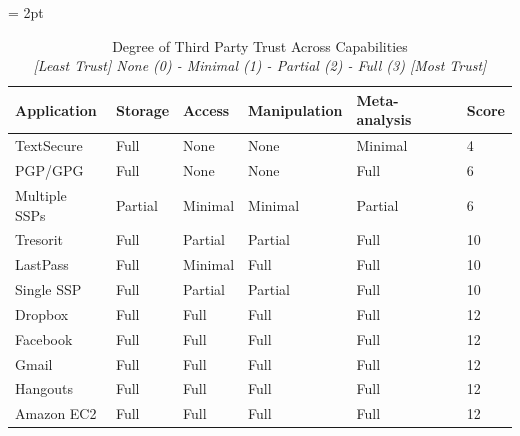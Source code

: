 \begin{table}[!hb]
  \footnotesize
  \centering
  \tabulinesep = 2pt
  \begin{tabu} to \textwidth
    { | X[1,c,m]
      | X[1,c,m]
      | X[1,c,m]
      | X[1,c,m]
      | X[1,c,m]
      | X[0.5,c,m]
      | }
    \hline
    \textbf{Application}
    & \textbf{Storage}
    & \textbf{Access}
    & \textbf{Manipulation}
    & \textbf{Meta-analysis}
    & \textbf{Score}
    \\ \hline
    \rowfont{\color{orange}}
    TextSecure
    & Full
    & None
    & None
    & Minimal
    & 4
    \\ \hline
    \rowfont{\color{orange}}
    PGP/GPG
    & Full
    & None
    & None
    & Full
    & 6
    \\ \hline 
    \rowfont{\color{ForestGreen}}
    Multiple SSPs
    & Partial
    & Minimal
    & Minimal
    & Partial
    & 6
    \\ \hline
    \rowfont{\color{orange}}
    Tresorit
    & Full
    & Partial
    & Partial
    & Full
    & 10
    \\ \hline 
    \rowfont{\color{orange}}
    LastPass
    & Full
    & Minimal
    & Full
    & Full
    & 10
    \\ \hline 
    \rowfont{\color{ForestGreen}}
    Single SSP
    & Full
    & Partial
    & Partial
    & Full
    & 10
    \\ \hline
    \rowfont{\color{blue}}
    Dropbox
    & Full
    & Full
    & Full
    & Full
    & 12
    \\ \hline
    \rowfont{\color{blue}}
    Facebook
    & Full
    & Full
    & Full
    & Full
    & 12
    \\ \hline
    \rowfont{\color{blue}}
    Gmail
    & Full
    & Full
    & Full
    & Full
    & 12
    \\ \hline
    \rowfont{\color{blue}}
    Hangouts
    & Full
    & Full
    & Full
    & Full
    & 12
    \\ \hline 
    \rowfont{\color{blue}}
    Amazon EC2
    & Full
    & Full
    & Full
    & Full
    & 12
    \\ \hline 
 \end{tabu}
  \caption[Degree of Third Party Trust Across Capabilities]{
    Degree of Third Party Trust Across Capabilities\\
    \textit{[Least Trust] None (0) - Minimal (1) - Partial (2) - Full (3) [Most Trust]}
  }
  \label{tab:trust:app:cap}
\end{table}

